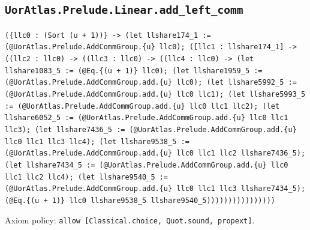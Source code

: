 \documentclass[11pt]{article}
\begin{document}
\subsection*{\texttt{UorAtlas.Prelude.Linear.add\_left\_comm}}
\noindent\texttt{(\{llc0 : (Sort (u + 1))\} -> (let llshare174\_1 := (@UorAtlas.Prelude.AddCommGroup.\{u\} llc0); ([llc1 : llshare174\_1] -> ((llc2 : llc0) -> ((llc3 : llc0) -> ((llc4 : llc0) -> (let llshare1083\_5 := (@Eq.\{(u + 1)\} llc0); (let llshare1959\_5 := (@UorAtlas.Prelude.AddCommGroup.add.\{u\} llc0); (let llshare5992\_5 := (@UorAtlas.Prelude.AddCommGroup.add.\{u\} llc0 llc1); (let llshare5993\_5 := (@UorAtlas.Prelude.AddCommGroup.add.\{u\} llc0 llc1 llc2); (let llshare6052\_5 := (@UorAtlas.Prelude.AddCommGroup.add.\{u\} llc0 llc1 llc3); (let llshare7436\_5 := (@UorAtlas.Prelude.AddCommGroup.add.\{u\} llc0 llc1 llc3 llc4); (let llshare9538\_5 := (@UorAtlas.Prelude.AddCommGroup.add.\{u\} llc0 llc1 llc2 llshare7436\_5); (let llshare7434\_5 := (@UorAtlas.Prelude.AddCommGroup.add.\{u\} llc0 llc1 llc2 llc4); (let llshare9540\_5 := (@UorAtlas.Prelude.AddCommGroup.add.\{u\} llc0 llc1 llc3 llshare7434\_5); (@Eq.\{(u + 1)\} llc0 llshare9538\_5 llshare9540\_5))))))))))))))))}\par
\noindent Axiom policy: \texttt{allow [Classical.choice, Quot.sound, propext]}.\par
\end{document}
